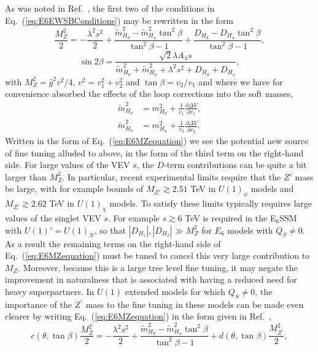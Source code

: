 \documentclass[preprint,amsmath,amssymb,aps,superscriptaddress,prd,
showpacs,floatfix,nofootinbib]{revtex4-1}
\begin{document}
As was noted in Ref.~\cite{Athron:2013ipa}, the first two of the conditions in
Eq.~(\ref{eq:E6EWSBConditions}) may be rewritten in the form
\begin{equation} \label{eq:E6MZequation}
\frac{M_Z^2}{2} = -\frac{\lambda^2 s^2}{2} + \frac{\tilde{m}_{H_d}^2 -
\tilde{m}_{H_u}^2 \tan^2\beta}{\tan^2\beta - 1} +
\frac{D_{H_d} - D_{H_u} \tan^2\beta}{\tan^2\beta - 1} ,
\end{equation}
\begin{equation} \label{eq:E6sin2bequation}
\sin 2\beta = \frac{\sqrt{2} \lambda A_{\lambda} s}
{\tilde{m}_{H_d}^2 + \tilde{m}_{H_u}^2 + \lambda^2 s^2 + D_{H_d} + D_{H_u}} ,
\end{equation}
with $M_Z^2 = \bar{g}^2 v^2 / 4$, $v^2 = v_1^2 + v_2^2$ and $\tan\beta =
v_2 / v_1$ and where we have for convenience absorbed the effects of the
loop corrections into the soft masses,
\begin{align*}
\tilde{m}_{H_d}^2 &= m_{H_d}^2 + \frac{1}{v_1} \frac{\partial \Delta V}
{\partial v_1} , \\
\tilde{m}_{H_u}^2 &= m_{H_u}^2 + \frac{1}{v_2} \frac{\partial \Delta V}
{\partial v_2} .
\end{align*}
Written in the form of Eq.~(\ref{eq:E6MZequation}) we see the
potential new source of fine tuning alluded to above, in the form of
the third term on the right-hand side.  For large values of the VEV
$s$, the $D$-term contributions can be quite a bit larger than
$M_Z^2$.  In particular, recent experimental limits \cite{Aad:2014cka}
require that the $Z'$ mass be large, with for example bounds of
$M_{Z'} \gtrsim 2.51$ TeV in $U(1)_\psi$ models and $M_{Z'} \gtrsim 2.62$ TeV
in $U(1)_\chi$ models.  To satisfy these limits typically requires large
values of the singlet VEV $s$.  For example $s \gtrsim 6$ TeV is required in
the E$_6$SSM with $U(1)' = U(1)_N$, so that $|D_{H_1}| , |D_{H_2}| \gg M_Z^2$
for $E_6$ models with $Q_S \neq 0$.  As a result the remaining terms on the
right-hand side of Eq.~(\ref{eq:E6MZequation}) must be tuned to cancel
this very large contribution to $M_Z$.  Moreover, because this is a large tree
level fine tuning, it may negate the improvement in naturalness that is
associated with having a reduced need for heavy superpartners.  In $U(1)$
extended models for which $Q_S\neq 0$, the importance of the $Z^\prime$ mass
to the fine tuning in these models can be made even clearer by writing
Eq.~(\ref{eq:E6MZequation}) in the form given in Ref.~\cite{Athron:2013ipa},
\begin{equation}\label{eq:originalE6MZequation}
c(\theta , \tan\beta) \frac{M_Z^2}{2} = -\frac{\lambda^2 s^2}{2} +
\frac{\tilde{m}_{H_d}^2 - \tilde{m}_{H_u}^2 \tan^2\beta}{\tan^2\beta - 1}
+ d(\theta , \tan\beta) \frac{M_{Z^\prime}^2}{2} ,
\end{equation}
\end{document}

